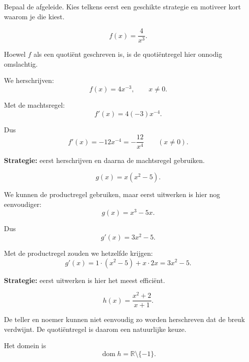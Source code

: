 \documentclass{ximera}
\begin{document}
  \begin{oefening}{\oefU\ESS}
  
  Bepaal de afgeleide. Kies telkens eerst een geschikte strategie en
  motiveer kort waarom je die kiest.
  
  \begin{question}
  
  \[
  f(x)=\frac{4}{x^3}.
  \]
  
  \begin{oplossing}
  Hoewel $f$ als een quotiënt geschreven is, is de quotiëntregel hier
  onnodig omslachtig.
  
  We herschrijven:
  \[
  f(x)=4x^{-3},
  \qquad x\neq0.
  \]
  
  Met de machtsregel:
  \[
  f'(x)=4(-3)x^{-4}.
  \]
  
  Dus
  \[
  \boxed{
  f'(x)=-12x^{-4}=-\frac{12}{x^4}
  }
  \qquad (x\neq0).
  \]
  
  \textbf{Strategie:} eerst herschrijven en daarna de machtsregel gebruiken.
  \end{oplossing}
  
  \end{question}
  
  
  \begin{question}
  
  \[
  g(x)=x(x^2-5).
  \]
  
  \begin{oplossing}
  We kunnen de productregel gebruiken, maar eerst uitwerken is hier
  nog eenvoudiger:
  \[
  g(x)=x^3-5x.
  \]
  
  Dus
  \[
  \boxed{
  g'(x)=3x^2-5
  }.
  \]
  
  Met de productregel zouden we hetzelfde krijgen:
  \[
  g'(x)=1\cdot(x^2-5)+x\cdot2x
       =3x^2-5.
  \]
  
  \textbf{Strategie:} eerst uitwerken is hier het meest efficiënt.
  \end{oplossing}
  
  \end{question}
  
  
  \begin{question}
  
  \[
  h(x)=\frac{x^2+2}{x+1}.
  \]
  
  \begin{oplossing}
  De teller en noemer kunnen niet eenvoudig zo worden herschreven
  dat de breuk verdwijnt. De quotiëntregel is daarom een natuurlijke keuze.
  
  Het domein is
  \[
  \operatorname{dom}h=\mathbb{R}\setminus\{-1\}.
  \]
  

\end{oplossing}
\end{question}
\end{oefening}
\end{document}
